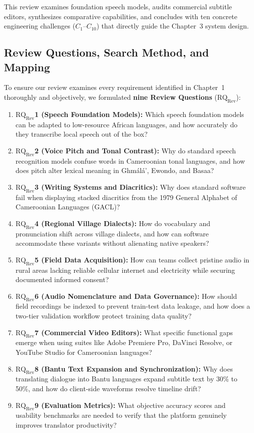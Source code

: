 \documentclass[a4paper,11pt]{article}
\begin{document}
This review examines foundation speech models, audits commercial subtitle editors, synthesizes comparative capabilities, and concludes with ten concrete engineering challenges ($C_1$--$C_{10}$) that directly guide the Chapter~3 system design.

\subsection{Review Questions, Search Method, and Mapping}
\label{sec:chap2_method}

To ensure our review examines every requirement identified in Chapter~1 thoroughly and objectively, we formulated \textbf{nine Review Questions} ($\text{RQ}_{\text{Rev}}$):
\begin{enumerate}
    \item \textbf{$\text{RQ}_{\text{Rev}}$1 (Speech Foundation Models):} Which speech foundation models can be adapted to low-resource African languages, and how accurately do they transcribe local speech out of the box?
    \item \textbf{$\text{RQ}_{\text{Rev}}$2 (Voice Pitch and Tonal Contrast):} Why do standard speech recognition models confuse words in Cameroonian tonal languages, and how does pitch alter lexical meaning in Gh\textopeno m\'al\'a', Ewondo, and Basaa?
    \item \textbf{$\text{RQ}_{\text{Rev}}$3 (Writing Systems and Diacritics):} Why does standard software fail when displaying stacked diacritics from the 1979 General Alphabet of Cameroonian Languages (GACL)?
    \item \textbf{$\text{RQ}_{\text{Rev}}$4 (Regional Village Dialects):} How do vocabulary and pronunciation shift across village dialects, and how can software accommodate these variants without alienating native speakers?
    \item \textbf{$\text{RQ}_{\text{Rev}}$5 (Field Data Acquisition):} How can teams collect pristine audio in rural areas lacking reliable cellular internet and electricity while securing documented informed consent?
    \item \textbf{$\text{RQ}_{\text{Rev}}$6 (Audio Nomenclature and Data Governance):} How should field recordings be indexed to prevent train-test data leakage, and how does a two-tier validation workflow protect training data quality?
    \item \textbf{$\text{RQ}_{\text{Rev}}$7 (Commercial Video Editors):} What specific functional gaps emerge when using suites like Adobe Premiere Pro, DaVinci Resolve, or YouTube Studio for Cameroonian languages?
    \item \textbf{$\text{RQ}_{\text{Rev}}$8 (Bantu Text Expansion and Synchronization):} Why does translating dialogue into Bantu languages expand subtitle text by 30\% to 50\%, and how do client-side waveforms resolve timeline drift?
    \item \textbf{$\text{RQ}_{\text{Rev}}$9 (Evaluation Metrics):} What objective accuracy scores and usability benchmarks are needed to verify that the platform genuinely improves translator productivity?
\end{enumerate}
\end{document}
